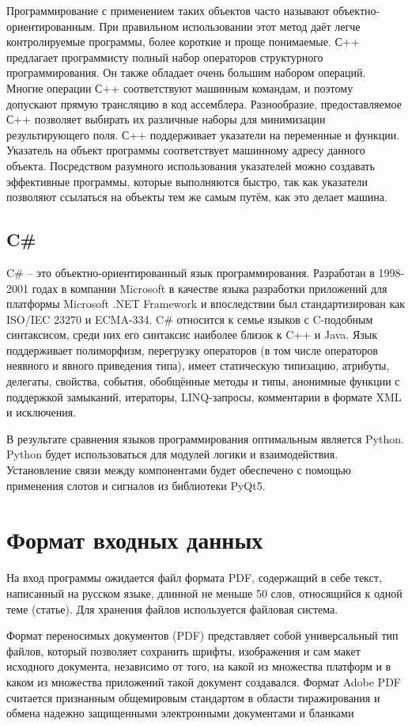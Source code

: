 Программирование с применением таких объектов часто называют объектно-ориентированным. 
При правильном использовании этот метод даёт легче контролируемые программы, более короткие и проще понимаемые. 
С++ предлагает программисту полный набор операторов структурного программирования. Он также обладает очень большим набором операций. 
Многие операции С++ соответствуют машинным командам, и поэтому допускают прямую трансляцию в код ассемблера. Разнообразие, предоставляемое С++ позволяет выбирать их различные наборы для минимизации результирующего поля. 
С++ поддерживает указатели на переменные и функции. 
Указатель на объект программы соответствует машинному адресу данного объекта. 
Посредством разумного использования указателей можно создавать эффективные программы, которые выполняются быстро, так как указатели позволяют ссылаться на объекты тем же самым путём, как это делает машина.

\subsection{C\#}
C\# – это объектно-ориентированный язык программирования. Разработан в 1998-2001 годах в компании Microsoft в качестве языка разработки приложений для платформы Microsoft .NET Framework и впоследствии был стандартизирован как ISO/IEC 23270 и ECMA-334. C\# относится к семье языков с C-подобным синтаксисом, среди них его синтаксис наиболее близок к C++ и Java. 
Язык поддерживает полиморфизм, перегрузку операторов (в том числе операторов неявного и явного приведения типа), имеет статическую типизацию, атрибуты, делегаты, свойства, события, обобщённые методы и типы, анонимные функции с поддержкой замыканий, итераторы, LINQ-запросы,
комментарии в формате XML и исключения.

В результате сравнения языков программирования оптимальным является Python.
Python будет использоваться для модулей логики и взаимодействия.
Установление связи между компонентами будет обеспечено с помощью применения слотов и сигналов из библиотеки PyQt5.

\section{Формат входных данных}
На вход программы ожидается файл формата PDF, содержащий в себе текст, написанный на русском языке, длинной не меньше 50 слов, относящийся к одной теме (статье). Для хранения файлов используется файловая система.

Формат переносимых документов (PDF) представляет собой универсальный тип файлов, который позволяет сохранить шрифты, изображения и сам макет исходного документа, независимо от того, на какой из множества платформ и в каком из множества приложений такой документ создавался. 
Формат Adobe PDF считается признанным общемировым стандартом в области тиражирования и обмена надежно защищенными электронными документами и бланками \cite{23}

